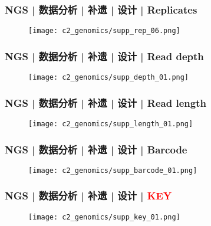 \begin{frame}
  \frametitle{NGS | 数据分析 | 补遗 | 设计 | Replicates}
  \begin{figure}
    \centering
    \texttt{[image: c2\_genomics/supp\_rep\_06.png]}
  \end{figure}
\end{frame}

\begin{frame}
  \frametitle{NGS | 数据分析 | 补遗 | 设计 | Read depth}
  \begin{figure}
    \centering
    \texttt{[image: c2\_genomics/supp\_depth\_01.png]}
  \end{figure}
\end{frame}

\begin{frame}
  \frametitle{NGS | 数据分析 | 补遗 | 设计 | Read length}
  \begin{figure}
    \centering
    \texttt{[image: c2\_genomics/supp\_length\_01.png]}
  \end{figure}
\end{frame}

\begin{frame}
  \frametitle{NGS | 数据分析 | 补遗 | 设计 | Barcode}
  \begin{figure}
    \centering
    \texttt{[image: c2\_genomics/supp\_barcode\_01.png]}
  \end{figure}
\end{frame}

\begin{frame}
  \frametitle{NGS | 数据分析 | 补遗 | 设计 | \textcolor{red}{KEY}}
  \begin{figure}
    \centering
    \texttt{[image: c2\_genomics/supp\_key\_01.png]}
  \end{figure}
\end{frame}

